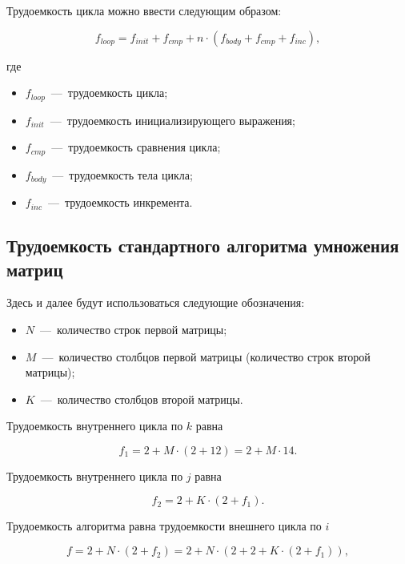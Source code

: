 Трудоемкость цикла можно ввести следующим образом:


\begin{equation}
	f_{loop} = f_{init} + f_{cmp} + n \cdot (f_{body} + f_{cmp} + f_{inc}),
\end{equation}

где

\begin{itemize}
	\item $f_{loop}$~---~трудоемкость цикла;
	\item $f_{init}$~---~трудоемкость инициализирующего выражения;
	\item $f_{cmp}$~---~трудоемкость сравнения цикла;
	\item $f_{body}$~---~трудоемкость тела цикла;
	\item $f_{inc}$~---~трудоемкость инкремента.
\end{itemize}

\subsection{Трудоемкость стандартного алгоритма умножения матриц}
Здесь и далее будут использоваться следующие обозначения:

\begin{itemize}
	\item $N$~---~количество строк первой матрицы;
	\item $M$~---~количество столбцов первой матрицы (количество строк второй матрицы);
	\item $K$~---~количество столбцов второй матрицы. 
\end{itemize}

Трудоемкость внутреннего цикла по $k$ равна

\begin{equation}
	f_1 = 2 + M \cdot (2 + 12) = 2 + M \cdot 14.
\end{equation}

Трудоемкость внутреннего цикла по $j$ равна

\begin{equation}
	f_2 = 2 + K \cdot (2 + f_1).
\end{equation}

Трудоемкость алгоритма равна трудоемкости внешнего цикла по $i$

\begin{equation}
	f = 2 + N \cdot (2 + f_2) = 2 + N \cdot (2 + 2 + K \cdot (2 + f_1)),
\end{equation}

